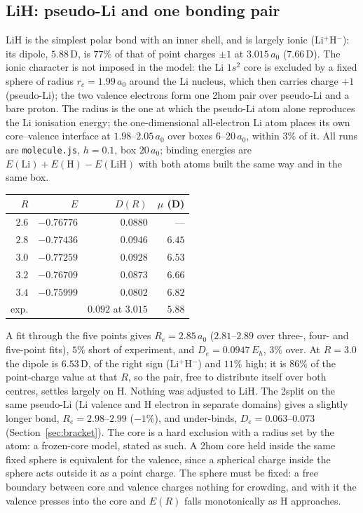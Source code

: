\documentclass[11pt]{article}
\begin{document}
\subsection{LiH: pseudo-Li and one bonding pair}
\label{sec:lih}

LiH is the simplest polar bond with an inner shell, and is largely ionic (Li$^+$H$^-$): its dipole,
$5.88$\,D, is $77\%$ of that of point charges $\pm1$ at $3.015\,a_0$ ($7.66$\,D). The ionic character is not
imposed in the model: the Li $1s^2$ core is
excluded by a fixed sphere of radius $r_c = 1.99\,a_0$ around the Li nucleus, which then carries charge
$+1$ (pseudo-Li); the two valence electrons form one 2hom pair over pseudo-Li and a bare proton.
The radius is the one at which the pseudo-Li atom alone reproduces the Li ionisation energy; the
one-dimensional all-electron Li atom places its own core--valence interface at
$1.98$--$2.05\,a_0$ over boxes $6$--$20\,a_0$, within $3\%$ of it. All runs are \texttt{molecule.js},
$h = 0.1$, box $20\,a_0$; binding energies are $E(\mathrm{Li}) + E(\mathrm{H}) - E(\mathrm{LiH})$ with
both atoms built the same way and in the same box.

\begin{center}
\small
\begin{tabular}{rrrr}
\toprule
$R$ & $E$ & $D(R)$ & $\mu$ (D) \\
\midrule
$2.6$ & $-0.76776$ & $0.0880$ & --- \\
$2.8$ & $-0.77436$ & $0.0946$ & $6.45$ \\
$3.0$ & $-0.77259$ & $0.0928$ & $6.53$ \\
$3.2$ & $-0.76709$ & $0.0873$ & $6.66$ \\
$3.4$ & $-0.75999$ & $0.0802$ & $6.82$ \\
\midrule
exp.  & & $0.092$ at $3.015$ & $5.88$ \\
\bottomrule
\end{tabular}
\end{center}
A fit through the five points gives $R_e = 2.85\,a_0$ ($2.81$--$2.89$ over three-, four- and five-point
fits), $5\%$ short of experiment, and $D_e = 0.0947\,E_h$, $3\%$ over. At $R = 3.0$ the dipole is
$6.53$\,D, of the right sign (Li$^+$H$^-$) and $11\%$ high; it is $86\%$ of the point-charge value
at that $R$, so the pair, free to distribute itself over both centres, settles largely on H.
Nothing was adjusted to LiH.
The 2split on the same pseudo-Li (Li valence and H electron in separate domains) gives a
slightly longer bond, $R_e = 2.98$--$2.99$ ($-1\%$), and under-binds, $D_e = 0.063$--$0.073$
(Section~\ref{sec:bracket}). The core is a hard exclusion with a radius set by the atom: a
frozen-core model, stated as such. A 2hom core held inside the same fixed sphere is equivalent for
the valence, since a spherical charge inside the sphere acts outside it as a point charge. The
sphere must be fixed: a free boundary between core and valence charges nothing for crowding, and with it
the valence presses into the core and $E(R)$ falls monotonically as H approaches.
\end{document}

